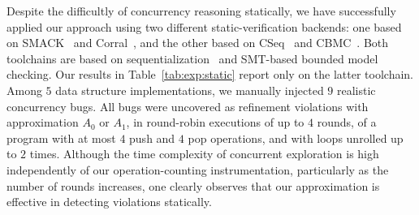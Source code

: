 Despite the difficultly of concurrency reasoning statically, we have
successfully applied our approach using two different static-verification
backends: one based on SMACK~\cite{conf/cav/RakamaricE14} and
Corral~\cite{conf/cav/LalQL12}, and the other based on
CSeq~\cite{conf/ase/FischerIP13} and CBMC~\cite{conf/tacas/KroeningT14}. Both
toolchains are based on sequentialization~\cite{journals/fmsd/LalR09} and
SMT-based bounded model checking. Our results in Table~\ref{tab:exp:static}
report only on the latter toolchain. Among $5$ data structure implementations,
we manually injected $9$ realistic concurrency bugs. All bugs were uncovered as
refinement violations with approximation $A_0$ or $A_1$, in round-robin
executions of up to $4$ rounds, of a program with at most $4$ {\sf push} and
$4$ {\sf pop} operations, and with loops unrolled up to $2$ times. Although the
time complexity of concurrent exploration is high independently of our
operation-counting instrumentation, particularly as the number of rounds
increases, one clearly observes that our approximation is effective in
detecting violations statically.

